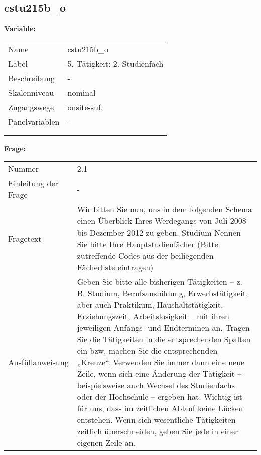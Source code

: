 	
	
	\subsection{cstu215b\_o}
	\label{subSection:cstu215b_o}

	\noindent\textbf{Variable:}\\
		\begin{tabular}{lL{11.3cm}}
			\label{tableVariable:cstu215b_o}
			Name & cstu215b\_o \\
			Label & 5. Tätigkeit: 2. Studienfach \\
			Beschreibung & - \\
			Skalenniveau & nominal \\
			Zugangswege &
				onsite-suf,
 \\
			Panelvariablen & -
			 \\
			 \\
 \\
		\end{tabular}

		\vspace*{1 cm}
		\noindent\textbf{Frage:}\\
		\begin{tabular}{lL{11.3cm}}
			\label{tableQuestion:cstu215b_o}
			Nummer & 2.1 \\
			Einleitung der Frage & - \\
			Fragetext & Wir bitten Sie nun, uns in dem folgenden Schema einen Überblick Ihres Werdegangs von Juli 2008 bis Dezember 2012 zu geben.
Studium
Nennen Sie bitte Ihre Hauptstudienfächer
(Bitte zutreffende Codes aus der beiliegenden Fächerliste eintragen) \\
			Ausfüllanweisung & Geben Sie bitte alle bisherigen Tätigkeiten – z. B. Studium, Berufsausbildung, Erwerbstätigkeit, aber auch Praktikum, Haushaltstätigkeit,
Erziehungszeit, Arbeitslosigkeit – mit ihren jeweiligen Anfangs- und Endterminen an. Tragen Sie die Tätigkeiten in die entsprechenden Spalten ein bzw. machen Sie die entsprechenden „Kreuze“. Verwenden Sie immer dann eine neue Zeile, wenn sich eine Änderung der Tätigkeit – beispielsweise auch Wechsel des Studienfachs oder der Hochschule – ergeben hat. Wichtig ist für uns, dass im zeitlichen Ablauf keine Lücken entstehen. Wenn sich wesentliche Tätigkeiten zeitlich überschneiden, geben Sie jede in einer eigenen Zeile an. \\
		\end{tabular}





